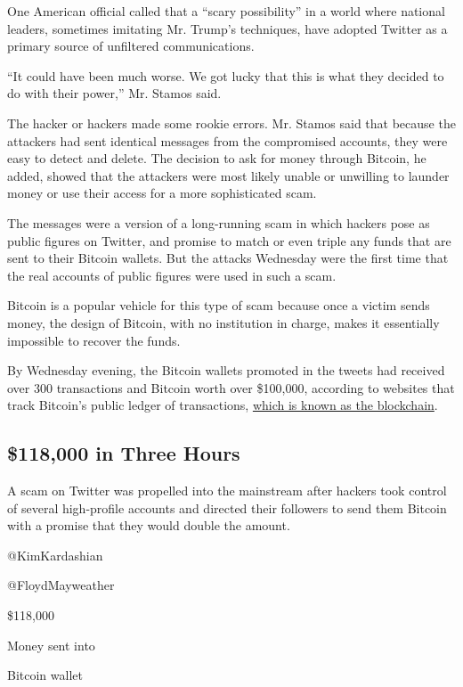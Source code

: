 One American official called that a ``scary possibility'' in a world
where national leaders, sometimes imitating Mr. Trump's techniques, have
adopted Twitter as a primary source of unfiltered communications.

``It could have been much worse. We got lucky that this is what they
decided to do with their power,'' Mr. Stamos said.

The hacker or hackers made some rookie errors. Mr. Stamos said that
because the attackers had sent identical messages from the compromised
accounts, they were easy to detect and delete. The decision to ask for
money through Bitcoin, he added, showed that the attackers were most
likely unable or unwilling to launder money or use their access for a
more sophisticated scam.

The messages were a version of a long-running scam in which hackers pose
as public figures on Twitter, and promise to match or even triple any
funds that are sent to their Bitcoin wallets. But the attacks Wednesday
were the first time that the real accounts of public figures were used
in such a scam.

Bitcoin is a popular vehicle for this type of scam because once a victim
sends money, the design of Bitcoin, with no institution in charge, makes
it essentially impossible to recover the funds.

By Wednesday evening, the Bitcoin wallets promoted in the tweets had
received over 300 transactions and Bitcoin worth over \$100,000,
according to websites that track Bitcoin's public ledger of
transactions,
\href{https://www.nytimes3xbfgragh.onion/2018/06/27/business/dealbook/blockchains-guide-information.html}{which
is known as the blockchain}.

\hypertarget{118000-in-three-hours}{%
\subsection{\$118,000 in Three Hours}\label{118000-in-three-hours}}

A scam on Twitter was propelled into the mainstream after hackers took
control of several high-profile accounts and directed their followers to
send them Bitcoin with a promise that they would double the amount.

@KimKardashian

@FloydMayweather

\$118,000

Money sent into

Bitcoin wallet


